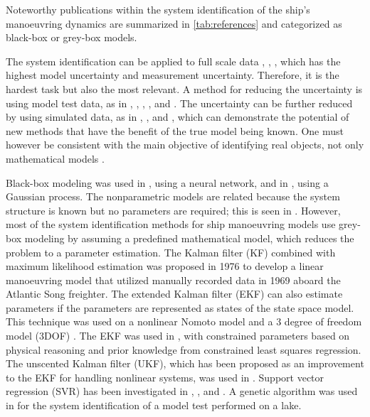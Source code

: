 Noteworthy publications within the system identification of the ship's manoeuvring dynamics are summarized in \autoref{tab:references} and categorized as black-box or grey-box models.
 
\noindent The system identification can be applied to full scale data \cite{astrom_identification_1976}, \cite{perera_system_2015}, \cite{revestido_herrero_two-step_2012}, which has the highest model uncertainty and measurement uncertainty. Therefore, it is the hardest task but also the most relevant. A method for reducing the uncertainty is using model test data, as in \cite{araki_estimating_2012}, \cite{he_nonparametric_2022}, \cite{xue_identification_2021}, \cite{miller_ship_2021}, and \cite{luo_parameter_2016}. The uncertainty can be further reduced by using simulated data, as in \cite{shi_identification_2009}, \cite{zhu_parameter_2017},  and \cite{wang_parameter_2021}, which can demonstrate the potential of new methods that have the benefit of the true model being known. One must however be consistent with the main objective of identifying real objects, not only mathematical models \cite{miller_ship_2021}.

\noindent Black-box modeling was used in \cite{he_nonparametric_2022}, using a neural network, and in \cite{xue_identification_2021}, using a Gaussian process. The nonparametric models are related because the system structure is known but no parameters are required; this is seen in \cite{pongduang_nonparametric_2020}. However, most of the system identification methods for ship manoeuvring models use grey-box modeling by assuming a predefined mathematical model, which reduces the problem to a parameter estimation.
The Kalman filter (KF) combined with maximum likelihood estimation was proposed in 1976 \cite{astrom_identification_1976} to develop a linear manoeuvring model that utilized manually recorded data in 1969 aboard the Atlantic Song freighter. The extended Kalman filter (EKF) can also estimate parameters if the parameters are represented as states of the state space model. This technique was used on a nonlinear Nomoto model \cite{perera_system_2015} and a 3 degree of freedom model (3DOF) \cite{shi_identification_2009}. The EKF was used in \cite{araki_estimating_2012}, with constrained parameters based on physical reasoning and prior knowledge from constrained least squares regression. The unscented Kalman filter (UKF), which has been proposed as an improvement to the EKF for handling nonlinear systems, was used in \cite{revestido_herrero_two-step_2012}.
Support vector regression (SVR) has been investigated in \cite{zhu_parameter_2017}, \cite{wang_parameter_2021}, and \cite{luo_parameter_2016}. A genetic algorithm was used in \cite{miller_ship_2021} for the system identification of a model test performed on a lake.





